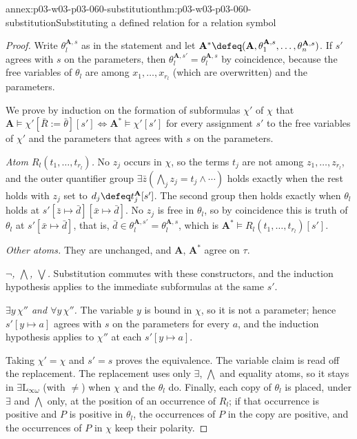 \begin{annexitem}{annex:p03-w03-p03-060-substitution}{thm:p03-w03-p03-060-substitution}{Substituting a defined relation for a relation symbol}
\begin{proof}
Write \(\theta_l^{\mathbf A,s}\) as in the statement and let
\(\mathbf A^\ast\defeq(\mathbf A,\theta_1^{\mathbf A,s},\ldots,\theta_n^{\mathbf A,s})\).
If \(s'\) agrees with \(s\) on the parameters, then
\(\theta_l^{\mathbf A,s'}=\theta_l^{\mathbf A,s}\) by coincidence, because
the free variables of \(\theta_l\) are among \(x_1,\ldots,x_{r_l}\) (which
are overwritten) and the parameters.

We prove by induction on the formation of subformulas \(\chi'\) of \(\chi\)
that \(\mathbf A\models\chi'[\bar R:=\bar\theta][s']\iff\mathbf A^\ast\models\chi'[s']\)
for every assignment \(s'\) to the free variables of \(\chi'\) and the
parameters that agrees with \(s\) on the parameters.

\emph{Atom \(R_l(t_1,\ldots,t_{r_l})\).} No \(z_j\) occurs in \(\chi\), so
the terms \(t_j\) are not among \(z_1,\ldots,z_{r_l}\), and the outer quantifier group
\(\exists\bar z(\bigwedge_jz_j=t_j\wedge\cdots)\) holds exactly when the
rest holds with \(z_j\) set to \(d_j\defeq t_j^{\mathbf A}[s']\). The second
group then holds exactly when \(\theta_l\) holds at
\(s'[\bar z\mapsto\bar d][\bar x\mapsto\bar d]\). No \(z_j\) is free in
\(\theta_l\), so by coincidence this is truth of \(\theta_l\) at
\(s'[\bar x\mapsto\bar d]\), that is,
\(\bar d\in\theta_l^{\mathbf A,s'}=\theta_l^{\mathbf A,s}\), which is
\(\mathbf A^\ast\models R_l(t_1,\ldots,t_{r_l})[s']\).

\emph{Other atoms.} They are unchanged, and \(\mathbf A\), \(\mathbf A^\ast\)
agree on \(\tau\).

\emph{\(\neg\), \(\bigwedge\), \(\bigvee\).} Substitution commutes with these
constructors, and the induction hypothesis applies to the immediate
subformulas at the same \(s'\).

\emph{\(\exists y\,\chi''\) and \(\forall y\,\chi''\).} The variable \(y\)
is bound in \(\chi\), so it is not a parameter; hence \(s'[y\mapsto a]\)
agrees with \(s\) on the parameters for every \(a\), and the induction
hypothesis applies to \(\chi''\) at each \(s'[y\mapsto a]\).

Taking \(\chi'=\chi\) and \(s'=s\) proves the equivalence. The variable
claim is read off the replacement. The replacement uses only \(\exists\),
\(\bigwedge\) and equality atoms, so it stays in
\(\exists\mathrm{L}_{\infty\omega}\) (with \(\neq\)) when \(\chi\) and the
\(\theta_l\) do. Finally, each copy of \(\theta_l\) is placed, under
\(\exists\) and \(\bigwedge\) only, at the position of an occurrence of
\(R_l\); if that occurrence is positive and \(P\) is positive in
\(\theta_l\), the occurrences of \(P\) in the copy are positive, and the
occurrences of \(P\) in \(\chi\) keep their polarity.
\end{proof}
\end{annexitem}

